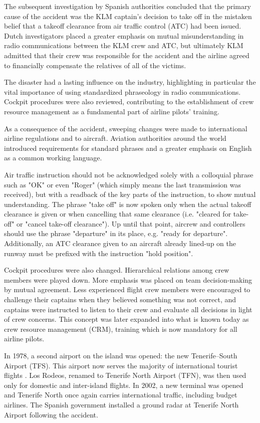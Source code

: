 \documentclass[a4paper,10pt]{article}
\begin{document}
The subsequent investigation by Spanish authorities concluded that the primary cause of the accident was the KLM captain's decision to take off in the mistaken belief that a takeoff clearance from air traffic control (ATC) had been issued. Dutch investigators placed a greater emphasis on mutual misunderstanding in radio communications between the KLM crew and ATC, but ultimately KLM admitted that their crew was responsible for the accident and the airline agreed to financially compensate the relatives of all of the victims.\par

The disaster had a lasting influence on the industry, highlighting in particular the vital importance of using standardized phraseology in radio communications. Cockpit procedures were also reviewed, contributing to the establishment of crew resource management as a fundamental part of airline pilots' training.\par

As a consequence of the accident, sweeping changes were made to international airline regulations and to aircraft. Aviation authorities around the world introduced requirements for standard phrases and a greater emphasis on English as a common working language.\par

Air traffic instruction should not be acknowledged solely with a colloquial phrase such as "OK" or even "Roger" (which simply means the last transmission was received), but with a readback of the key parts of the instruction, to show mutual understanding. The phrase "take off" is now spoken only when the actual takeoff clearance is given or when cancelling that same clearance (i.e. "cleared for take-off" or "cancel take-off clearance"). Up until that point, aircrew and controllers should use the phrase "departure" in its place, e.g. "ready for departure". Additionally, an ATC clearance given to an aircraft already lined-up on the runway must be prefixed with the instruction "hold position".\par

Cockpit procedures were also changed. Hierarchical relations among crew members were played down. More emphasis was placed on team decision-making by mutual agreement. Less experienced flight crew members were encouraged to challenge their captains when they believed something was not correct, and captains were instructed to listen to their crew and evaluate all decisions in light of crew concerns. This concept was later expanded into what is known today as crew resource management (CRM), training which is now mandatory for all airline pilots.\par
In 1978, a second airport on the island was opened: the new Tenerife–South Airport (TFS). This airport now serves the majority of international tourist flights
. Los Rodeos, renamed to Tenerife North Airport (TFN), was then used only for domestic and inter-island flights. In 2002, a new terminal was opened and Tenerife North once again carries international traffic, including budget airlines. The Spanish government installed a ground radar at Tenerife North Airport following the accident.
\end{document}
